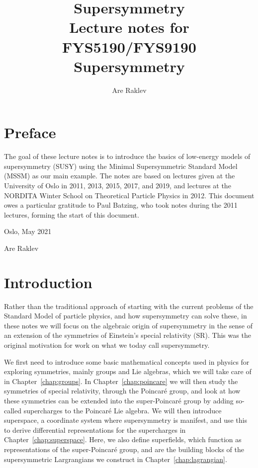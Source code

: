 \documentclass[11pt,a4paper]{book}
\title{{\Huge Supersymmetry} \\ 
\vspace{5mm} Lecture notes for FYS5190/FYS9190 Supersymmetry}
\author{Are Raklev}
\begin{document}

\maketitle


\chapter*{Preface}


The goal of these lecture notes is to introduce the basics of low-energy models of supersymmetry (SUSY) using the Minimal Supersymmetric Standard Model (MSSM) as our main example. The notes are based on lectures given at the University of Oslo in 2011, 2013, 2015, 2017, and 2019, and lectures at the NORDITA Winter School on Theoretical Particle Physics in 2012. This document owes a particular gratitude to Paul Batzing, who took notes during the 2011 lectures, forming the start of this document.


\vspace{5mm}
Oslo, May 2021

Are Raklev





\tableofcontents



\chapter*{Introduction}
Rather than the traditional approach of starting with the current problems of the Standard Model of particle physics, and how supersymmetry can solve these, in these notes we will focus on the algebraic origin of supersymmetry in the sense of an extension of the symmetries of Einstein's special relativity (SR). This was the original motivation for work on what we today call supersymmetry. 

We first need to introduce some basic mathematical concepts used in physics for exploring symmetries, mainly groups and Lie algebras, which we will take care of in Chapter~\ref{chap:groups}. 
In Chapter~\ref{chap:poincare} we will then study the symmetries of special relativity, through the Poincaré group, and look at how these symmetries can be extended into the super-Poincaré group by adding so-called supercharges to the Poincaré Lie algebra.
We will then introduce superspace, a coordinate system where supersymmetry is manifest, and use this to derive differential representations for the supercharges in Chapter~\ref{chap:superspace}. Here, we also define superfields, which function as representations of the super-Poincaré group, and are the building blocks of the supersymmetric Largrangians we construct in Chapter~\ref{chap:lagrangian}.
\end{document}
